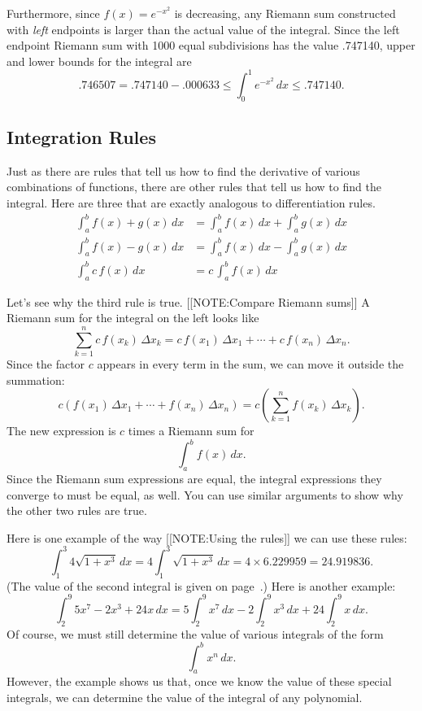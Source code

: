 Furthermore, since $f(x) = e^{-x^2}$ is decreasing, any Riemann sum
constructed with {\em left\/} endpoints is larger than the actual
value of the integral.  Since the left endpoint Riemann sum with 1000
equal subdivisions has the value .747140, upper and lower bounds for
the integral are
	\[
.746507 = .747140 - .000633 \leq 
		\int_0^1 e^{-x^2} \, dx \leq .747140.
\]

\subsection{Integration Rules}
\label{subsec:integration-rules}

Just as there are rules that tell us how to find the derivative of
various combinations of functions, there are other rules that tell us
how to find the integral.  Here are three that are exactly analogous
to differentiation rules.
\begin{align*}
{\displaystyle \int_a^b f(x) + g(x) \, dx} &=
	{\displaystyle \int_a^b f(x) \, dx} +
		{\displaystyle \int_a^b g(x) \, dx} \\[3pt]
{\displaystyle \int_a^b f(x) - g(x) \, dx} &=
	{\displaystyle \int_a^b f(x) \, dx} -
		{\displaystyle \int_a^b g(x) \, dx} \\[3pt]
{\displaystyle \int_a^b c \,f(x) \, dx} &=
		c \,{\displaystyle \int_a^b f(x) \, dx} 
\end{align*}

Let's see why the third rule is true.  
[[NOTE:Compare  Riemann sums]]
A Riemann sum for the integral on the left looks like
	\[
\sum_{k = 1}^n c \,f(x_k)\, \Delta x_k = 
		c \,f(x_1)\,\Delta x_1 + \cdots + 
		c \,f(x_n)\,\Delta x_n.
\]
Since the factor $c$ appears in every term in the sum, we can move it outside the summation:
	\[
c \left(f(x_1)\,\Delta x_1 + \cdots + 
		f(x_n)\,\Delta x_n \right) = 
	c \left(\sum_{k = 1}^n f(x_k)\, \Delta x_k \right).
\]
The new expression is $c$ times a Riemann sum for 
	\[
\int_a^b f(x) \, dx.
\]
Since the Riemann sum expressions are equal, the integral expressions they converge to must be equal, as well.  You can use similar arguments to show why the other two rules are true.

	Here is one example of the way 
	[[NOTE:Using the rules]]
we can use these rules: 
	\[
\int_1^3 4 \sqrt{1 + x^3} \, dx = 
		4 \int_1^3 \sqrt{1 + x^3} \, dx = 
		4 \times 6.229959 = 24.919836.
\]
(The value of the second integral is given on page~\pageref{2ndint}.)  Here is another example:
	\[
\int_2^9 5x^7 - 2 x^3 + 24 x \, dx =
		5 \int_2^9 x^7 \, dx - 2 \int_2^9 x^3 \, dx +
		24 \int_2^9 x \, dx.
\]
Of course, we must still determine the value of various integrals of the form
	\[
\int_a^b x^n \, dx.
\]
However, the example shows us that, once we know the value of these special integrals, we can determine the value of the integral of any polynomial.

